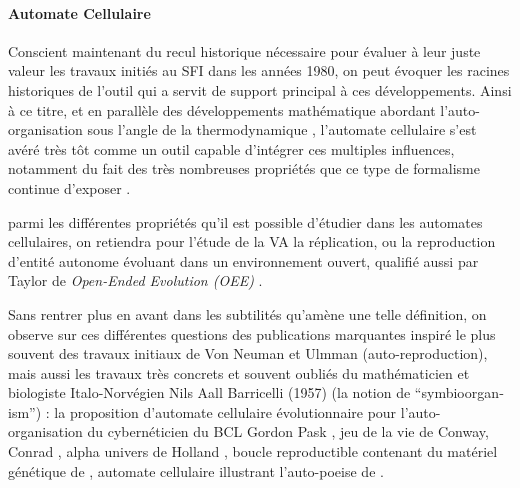 \paragraph{Automate Cellulaire}
\label{p:va_automate_cellulaire}

Conscient maintenant du recul historique nécessaire pour évaluer à leur juste valeur les travaux initiés au SFI dans les années 1980, on peut évoquer les racines historiques de l'outil qui a servit de support principal à ces développements. Ainsi à ce titre, et en parallèle des développements mathématique abordant l'auto-organisation sous l'angle de la thermodynamique , l'automate cellulaire s'est avéré très tôt comme un outil capable d'intégrer ces multiples influences, notamment du fait des très nombreuses propriétés que ce type de formalisme continue d'exposer \autocite{Ganguly2003}. %

parmi les différentes propriétés qu'il est possible d'étudier dans les automates cellulaires, on retiendra pour l'étude de la VA la réplication, ou la reproduction  d'entité autonome évoluant dans un environnement ouvert, qualifié aussi par Taylor de \textit{Open-Ended Evolution (OEE)} .

Sans rentrer plus en avant dans les subtilités qu'amène une telle définition, on observe sur ces différentes questions des publications marquantes inspiré le plus souvent des travaux initiaux de Von Neuman et Ulmman (auto-reproduction), mais aussi les travaux très concrets et souvent oubliés \autocites[111-130]{Dyson1997}{Fogel1998, Taylor1999, Hackett2014} du mathématicien et biologiste Italo-Norvégien Nils Aall Barricelli (1957) (la notion de \foreignquote{english}{symbioorganism}) : la proposition d'automate cellulaire évolutionnaire pour l'auto-organisation du cybernéticien du BCL Gordon Pask \autocite{Pask1961}, jeu de la vie de Conway, Conrad \textcite{Conrad1970}, alpha univers de Holland \autocite{Holland1976}, boucle reproductible contenant du matériel génétique de \textcite{Langton1984}, automate cellulaire illustrant l'auto-poeise de \textcite{Varela1974,McMullin1997b, McMullin1997, McMullin2004}.

